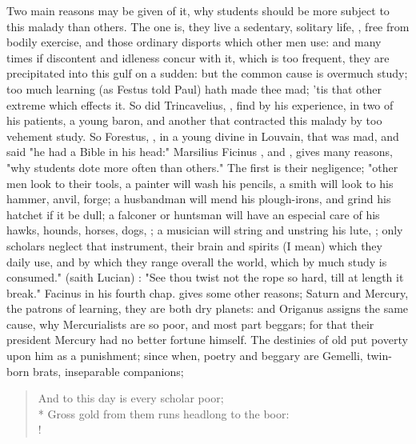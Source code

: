 Two main reasons may be given of it, why students should be more subject to
this malady than others. The one is, they live a sedentary, solitary life,
, free from bodily exercise, and those ordinary disports
which other men use: and many times if discontent and idleness concur with it,
which is too frequent, they are precipitated into this gulf on a sudden: but
the common cause is overmuch study; too much learning (as
Festus told Paul) hath made thee mad; 'tis that other
extreme which effects it. So did Trincavelius, , find by his experience, in two of his patients, a young
baron, and another that contracted this malady by too vehement study. So
Forestus, , in a young divine
in Louvain, that was mad, and said "he had a Bible in his
head:" Marsilius Ficinus , and , gives many reasons,
"why students dote more often than others." The first is
their negligence; "other men look to their tools, a
painter will wash his pencils, a smith will look to his hammer, anvil, forge; a
husbandman will mend his plough-irons, and grind his hatchet if it be dull; a
falconer or huntsman will have an especial care of his hawks, hounds, horses,
dogs, \etc{}; a musician will string and unstring his lute, \etc{}; only
scholars neglect that instrument, their brain and spirits (I mean) which they
daily use, and by which they range overall the world, which by much study is
consumed."  (saith Lucian) : "See thou twist not the rope so hard, till at length it
break." Facinus in his fourth chap. gives some other
reasons; Saturn and Mercury, the patrons of learning, they are both dry
planets: and Origanus assigns the same cause, why Mercurialists are so poor,
and most part beggars; for that their president Mercury had no better fortune
himself. The destinies of old put poverty upon him as a punishment; since when,
poetry and beggary are Gemelli, twin-born brats, inseparable companions;

\begin{verse}%
\end{verse}%
\begin{verse}%
And to this day is every scholar poor;\\*
Gross gold from them runs headlong to the boor:\\!
\end{verse}%


